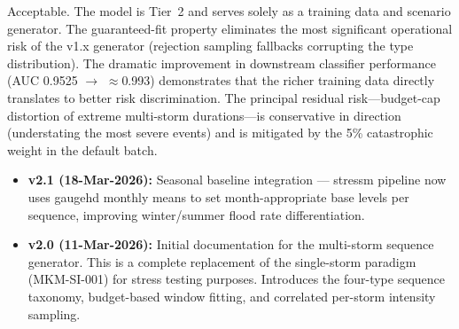\documentclass[11pt,a4paper]{article}
\begin{document}
Acceptable. The model is Tier~2 and serves solely as a training data and scenario generator. The guaranteed-fit property eliminates the most significant operational risk of the v1.x generator (rejection sampling fallbacks corrupting the type distribution). The dramatic improvement in downstream classifier performance (AUC 0.9525 $\to$ $\approx$0.993) demonstrates that the richer training data directly translates to better risk discrimination. The principal residual risk---budget-cap distortion of extreme multi-storm durations---is conservative in direction (understating the most severe events) and is mitigated by the 5\% catastrophic weight in the default batch.

\clearpage

\mkmchangelog

\begin{itemize}[nosep]
  \item \textbf{v2.1 (18-Mar-2026):} Seasonal baseline integration --- stressm
        pipeline now uses gaugehd monthly means to set month-appropriate base
        levels per sequence, improving winter/summer flood rate differentiation.
  \item \textbf{v2.0 (11-Mar-2026):} Initial documentation for the multi-storm
        sequence generator. This is a complete replacement of the single-storm
        paradigm (MKM-SI-001) for stress testing purposes. Introduces the
        four-type sequence taxonomy, budget-based window fitting, and correlated
        per-storm intensity sampling.
\end{itemize}

\end{document}
